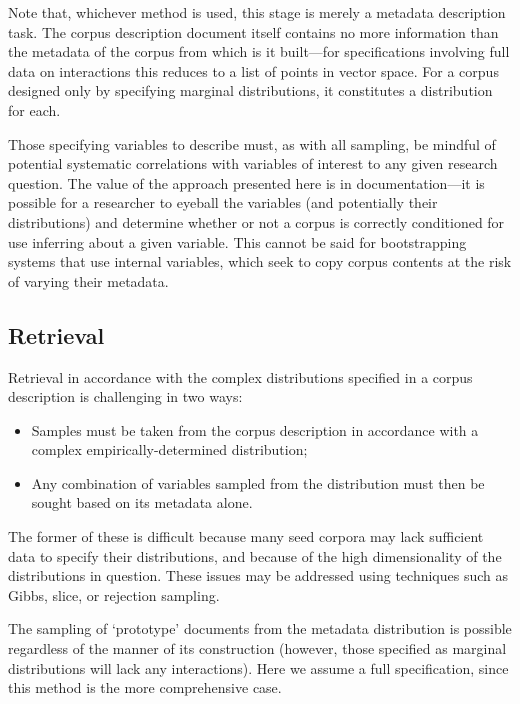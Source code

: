Note that, whichever method is used, this stage is merely a metadata description task.  The corpus description document itself contains no more information than the metadata of the corpus from which is it built---for specifications involving full data on interactions this reduces to a list of points in vector space.  For a corpus designed only by specifying marginal distributions, it constitutes a distribution for each.

Those specifying variables to describe must, as with all sampling, be mindful of potential systematic correlations with variables of interest to any given research question.  The value of the approach presented here is in documentation---it is possible for a researcher to eyeball the variables (and potentially their distributions) and determine whether or not a corpus is correctly conditioned for use inferring about a given variable.  This cannot be said for bootstrapping systems that use internal variables, which seek to copy corpus contents at the risk of varying their metadata.


\subsection{Retrieval}
Retrieval in accordance with the complex distributions specified in a corpus description is challenging in two ways:

\begin{itemize}
    \item Samples must be taken from the corpus description in accordance with a complex empirically-determined distribution;
    \item Any combination of variables sampled from the distribution must then be sought based on its metadata alone.
\end{itemize}

The former of these is difficult because many seed corpora may lack sufficient data to specify their distributions, and because of the high dimensionality of the distributions in question.  These issues may be addressed using techniques such as Gibbs, slice, or rejection sampling.

The sampling of `prototype' documents from the metadata distribution is possible regardless of the manner of its construction (however, those specified as marginal distributions will lack any interactions).  Here we assume a full specification, since this method is the more comprehensive case.


